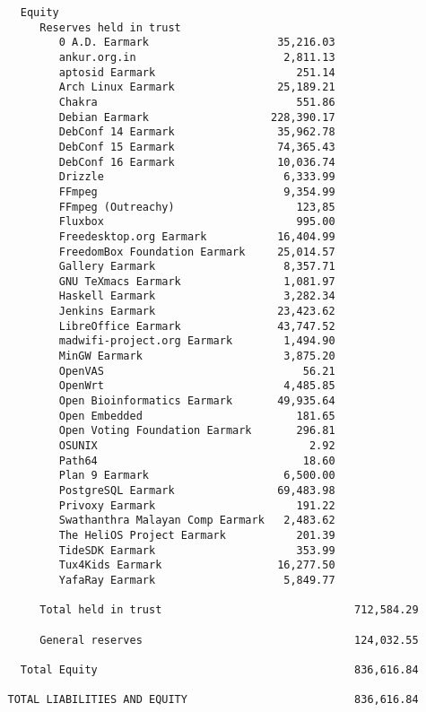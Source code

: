 \documentclass[letterpaper]{report}
\begin{document}
\begin{verbatim}
     Equity
        Reserves held in trust
           0 A.D. Earmark                    35,216.03
           ankur.org.in                       2,811.13
           aptosid Earmark                      251.14
           Arch Linux Earmark                25,189.21
           Chakra                               551.86
           Debian Earmark                   228,390.17
           DebConf 14 Earmark                35,962.78
           DebConf 15 Earmark                74,365.43
           DebConf 16 Earmark                10,036.74
           Drizzle                            6,333.99
           FFmpeg                             9,354.99
           FFmpeg (Outreachy)                   123,85
           Fluxbox                              995.00
           Freedesktop.org Earmark           16,404.99
           FreedomBox Foundation Earmark     25,014.57
           Gallery Earmark                    8,357.71
           GNU TeXmacs Earmark                1,081.97
           Haskell Earmark                    3,282.34
           Jenkins Earmark                   23,423.62
           LibreOffice Earmark               43,747.52
           madwifi-project.org Earmark        1,494.90
           MinGW Earmark                      3,875.20
           OpenVAS                               56.21
           OpenWrt                            4,485.85
           Open Bioinformatics Earmark       49,935.64
           Open Embedded                        181.65
           Open Voting Foundation Earmark       296.81
           OSUNIX                                 2.92
           Path64                                18.60
           Plan 9 Earmark                     6,500.00
           PostgreSQL Earmark                69,483.98
           Privoxy Earmark                      191.22
           Swathanthra Malayan Comp Earmark   2,483.62
           The HeliOS Project Earmark           201.39
           TideSDK Earmark                      353.99
           Tux4Kids Earmark                  16,277.50
           YafaRay Earmark                    5,849.77

        Total held in trust                              712,584.29

        General reserves                                 124,032.55

     Total Equity                                        836,616.84

   TOTAL LIABILITIES AND EQUITY                          836,616.84
\end{verbatim}
\end{document}
